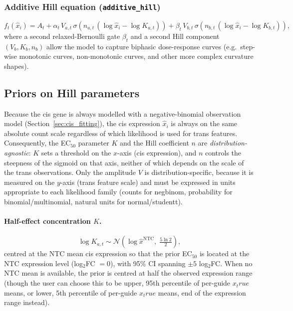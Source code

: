 \documentclass[12pt]{article}
\begin{document}
\subsubsection{Additive Hill equation (\texttt{additive\_hill})}

\begin{equation}
  f_t(\hat x_i) = A_t
    + \alpha_t \, V_{a,t} \, \sigma\!\left(n_{a,t}\,(\log\hat x_i - \log K_{a,t})\right)
    + \beta_t  \, V_{b,t} \, \sigma\!\left(n_{b,t}\,(\log\hat x_i - \log K_{b,t})\right),
  \label{eq:additive_hill}
\end{equation}
%
where a second relaxed-Bernoulli gate $\beta_t$ and a second Hill component $(V_b, K_b, n_b)$
allow the model to capture biphasic dose-response curves (e.g.\ step-wise monotonic curves,
non-monotonic curves, and other more complex curvature shapes).

\subsection{Priors on Hill parameters}

Because the cis gene is always modelled with a negative-binomial observation model
(Section~\ref{sec:cis_fitting}), the cis expression $\hat x_i$ is always on the same
absolute count scale regardless of which likelihood is used for trans features.
Consequently, the EC$_{50}$ parameter $K$ and the Hill coefficient $n$ are
\emph{distribution-agnostic}: $K$ sets a threshold on the $x$-axis (cis expression),
and $n$ controls the steepness of the sigmoid on that axis, neither of which depends on
the scale of the trans observations.
Only the amplitude $V$ is distribution-specific, because it is measured on the $y$-axis
(trans feature scale) and must be expressed in units appropriate to each likelihood family
(counts for negbinom, probability for binomial/multinomial, natural units for normal/studentt).

\paragraph{Half-effect concentration $K$.}

\begin{equation}
  \log K_{a,t} \sim \mathcal{N}\!\left(\log \hat x^{\mathrm{NTC}},\;
    \tfrac{5\ln 2}{2}\right),
\end{equation}
centred at the NTC mean cis expression so that the prior EC$_{50}$ is located at the
NTC expression level (log$_2$FC $= 0$), with 95\% CI spanning $\pm 5$ log$_2$FC.
When no NTC mean is available, the prior is centred at half the observed expression range
(though the user can choose this to be upper, 95th percentile of per-guide $x_true$ means, or lower, 5th percentile of per-guide $x_true$ means, end of the expression range instead).
\end{document}
